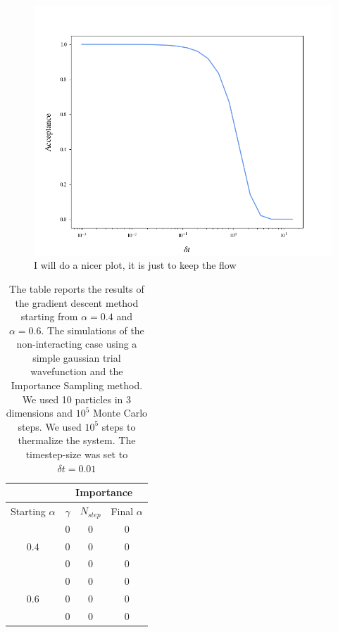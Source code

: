 \begin{figure}[H]
    \centering
    \includegraphics[scale=0.45]{images/time_steplength.png}
    \caption{I will do a nicer plot, it is just to keep the flow}
    \label{fig:dt_importance_sampling}
\end{figure}


\begin{table}[h]
\centering
 \begin{tabular}{c|c|c|c|}
         & \multicolumn{3}{c|}{Importance} \\
        \hline
         Starting $\alpha$ & $\gamma$ & $N_{step}$ & Final $\alpha$ \\
       \hline
          & $0$ & $0$ & $0$ \\
         $0.4$ & $0$ & $0$ & $0$ \\
          & $0$ & $0$ & $0$ \\
         \hline
          & $0$ & $0$ & $0$ \\
         $0.6$ & $0$ & $0$ & $0$ \\
          & $0$ & $0$ & $0$ \\
         \hline
    \end{tabular}
    \caption{The table reports the results of the gradient descent method starting from $\alpha=0.4$ and $\alpha=0.6$. The simulations of the non-interacting case using a simple gaussian trial wavefunction and the Importance Sampling method. We used 10 particles in 3 dimensions and $10^5$ Monte Carlo steps. We used $10^5$ steps to thermalize the system. The timestep-size was set to $\delta t= 0.01$  }
\end{table}

